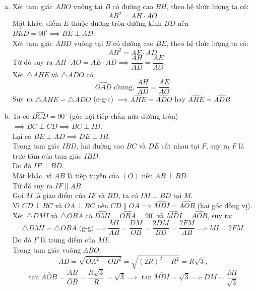 \begin{bt}
{\begin{enumerate}[a)]
    Tứ giác $ABOC$ có $\widehat{ABO} + \widehat{ACO} = 90^\circ + 90^\circ = 180^\circ$ nên nội tiếp đường tròn đường kính $OA$.\\
    Ta có $AB = AC$ (tính chất hai tiếp tuyến cắt nhau) và $OB = OC = R$, nên $OA$ là đường trung trực của đoạn thẳng $BC$. Do đó $OA \perp BC$ tại $H$.
    \item Xét tam giác $ABO$ vuông tại $B$ có đường cao $BH$, theo hệ thức lượng ta có:
    $$AB^2 = AH \cdot AO.$$
    Mặt khác, điểm $E$ thuộc đường tròn đường kính $BD$ nên $\widehat{BED} = 90^\circ \implies BE \perp AD$.\\
    Xét tam giác $ABD$ vuông tại $B$ có đường cao $BE$, theo hệ thức lượng ta có:
    $$AB^2 = AE \cdot AD.$$
    Từ đó suy ra $AH \cdot AO = AE \cdot AD \implies \dfrac{AH}{AD} = \dfrac{AE}{AO}$.\\
    Xét $\triangle AHE$ và $\triangle ADO$ có:
    $$\widehat{OAD}\text{ chung, } \dfrac{AH}{AD} = \dfrac{AE}{AO}.$$
    Suy ra $\triangle AHE \backsim \triangle ADO$ (c-g-c) $\implies \widehat{AHE} = \widehat{ADO}$ hay $\widehat{AHE} = \widehat{ADB}$.
    \item Ta có $\widehat{BCD} = 90^\circ$ (góc nội tiếp chắn nửa đường tròn) $\implies BC \perp CD \implies BC \perp ID$.\\
    Lại có $BE \perp AD \implies DE \perp IB$.\\
    Trong tam giác $IBD$, hai đường cao $BC$ và $DE$ cắt nhau tại $F$, suy ra $F$ là trực tâm của tam giác $IBD$.\\
    Do đó $IF \perp BD$.\\
    Mặt khác, vì $AB$ là tiếp tuyến của $(O)$ nên $AB \perp BD$.\\
    Từ đó suy ra $IF \parallel AB$.\\
    Gọi $M$ là giao điểm của $IF$ và $BD$, ta có $IM \perp BD$ tại $M$.\\
    Vì $CD \perp BC$ và $OA \perp BC$ nên $CD \parallel OA \implies \widehat{MDI} = \widehat{AOB}$ (hai góc đồng vị).\\
    Xét $\triangle DMI$ và $\triangle OBA$ có $\widehat{DMI} = \widehat{OBA} = 90^\circ$ và $\widehat{MDI} = \widehat{AOB}$, suy ra:
    $$\triangle DMI \backsim \triangle OBA\text{ (g-g)} \implies \dfrac{MI}{AB} = \dfrac{DM}{OB} = \dfrac{2DM}{BD} = \dfrac{2FM}{AB} \implies MI = 2FM.$$
    Do đó $F$ là trung điểm của $MI$.\\
    Trong tam giác vuông $ABO$:
    $$AB = \sqrt{OA^2 - OB^2} = \sqrt{(2R)^2 - R^2} = R\sqrt{3},$$
    $$\tan \widehat{AOB} = \dfrac{AB}{OB} = \dfrac{R\sqrt{3}}{R} = \sqrt{3} \implies \tan \widehat{MDI} = \sqrt{3} \implies DM = \dfrac{MI}{\sqrt{3}}.$$

\end{enumerate}}
\end{bt}
